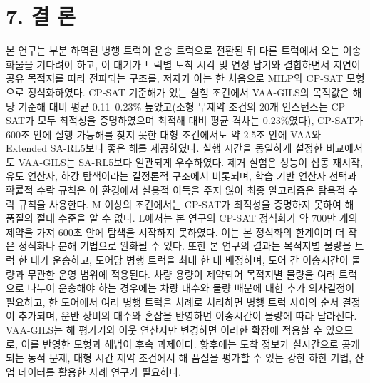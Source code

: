 \documentclass[10pt,a4paper]{article}
\begin{document}
\section{7. 결 론}
본 연구는 부분 하역된 병행 트럭이 운송 트럭으로 전환된 뒤 다른 트럭에서 오는 이송 화물을 기다려야 하고,
이 대기가 트럭별 도착 시각 및 연성 납기와 결합하면서 지연이 공유 목적지를 따라 전파되는 구조를, 저자가 아는 한 처음으로 MILP와 CP-SAT 모형으로 정식화하였다. CP-SAT
기준해가 있는 실험 조건에서 VAA-GILS의 목적값은 해당 기준해 대비 평균 0.11--0.23\% 높았고(소형 무제약 조건의 20개 인스턴스는 CP-SAT가 모두 최적성을 증명하였으며 최적해 대비 평균 격차는 0.23\%였다), CP-SAT가 600초 안에 실행 가능해를 찾지 못한 대형
조건에서도 약 2.5초 안에 VAA와 Extended SA-RL5보다 좋은 해를 제공하였다.
실행 시간을 동일하게 설정한 비교에서도 VAA-GILS는 SA-RL5보다 일관되게 우수하였다.
제거 실험은 성능이 섭동 재시작, 유도 연산자, 하강 탐색이라는 결정론적
구조에서 비롯되며, 학습 기반 연산자 선택과 확률적 수락 규칙은 이
환경에서 실용적 이득을 주지 않아 최종 알고리즘은 탐욕적 수락 규칙을 사용한다. %
M 이상의 조건에서는 CP-SAT가 최적성을 증명하지 못하여 해 품질의 절대 수준을 알 수 없다. L에서는 본 연구의 CP-SAT 정식화가 약 700만 개의 제약을 가져 600초 안에 탐색을 시작하지 못하였다. 이는 본 정식화의 한계이며 더 작은 정식화나 분해 기법으로 완화될 수 있다. 또한 본 연구의 결과는 목적지별 물량을 트럭 한 대가 운송하고, 도어당 병행 트럭을 최대 한 대 배정하며, 도어 간 이송시간이 물량과 무관한 운영 범위에 적용된다. 차량 용량이 제약되어 목적지별 물량을 여러 트럭으로 나누어 운송해야 하는 경우에는 차량 대수와 물량 배분에 대한 추가 의사결정이 필요하고, 한 도어에서 여러 병행 트럭을 차례로 처리하면 병행 트럭 사이의 순서 결정이 추가되며, 운반 장비의 대수와 혼잡을 반영하면 이송시간이 물량에 따라 달라진다. VAA-GILS는 해 평가기와 이웃 연산자만 변경하면 이러한 확장에 적용할 수 있으므로, 이를 반영한 모형과 해법이 후속 과제이다. 향후에는 도착 정보가 실시간으로 공개되는 동적
문제, 대형 시간 제약 조건에서 해 품질을 평가할 수 있는 강한 하한 기법, 산업 데이터를 활용한 사례 연구가 필요하다.

\appendix
\end{document}
